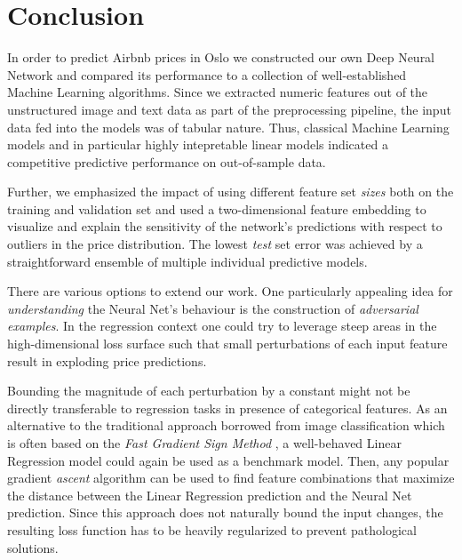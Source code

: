 \section{Conclusion}

In order to predict Airbnb prices in Oslo we constructed our own Deep Neural Network and compared its performance to a collection of well-established Machine Learning algorithms.
Since we extracted numeric features out of the unstructured image and text data as part of the preprocessing pipeline, the input data fed into the models was of tabular nature.
Thus, classical Machine Learning models and in particular highly intepretable linear models indicated a competitive predictive performance on out-of-sample data.

Further, we emphasized the impact of using different feature set \emph{sizes} both on the training and validation set and used a two-dimensional feature embedding to visualize and explain the sensitivity of the network's predictions with respect to outliers in the price distribution.
The lowest \emph{test} set error was achieved by a straightforward ensemble of multiple individual predictive models.

There are various options to extend our work.
One particularly appealing idea for \emph{understanding} the Neural Net's behaviour is the construction of \emph{adversarial examples}.
In the regression context one could try to leverage steep areas in the high-dimensional loss surface such that small perturbations of each input feature result in exploding price predictions.

Bounding the magnitude of each perturbation by a constant might not be directly transferable to regression tasks in presence of categorical features.
As an alternative to the traditional approach borrowed from image classification which is often based on the \emph{Fast Gradient Sign Method} \citep{goodfellow2015}, a well-behaved Linear Regression model could again be used as a benchmark model.
Then, any popular gradient \emph{ascent} algorithm can be used to find feature combinations that maximize the distance between the Linear Regression prediction and the Neural Net prediction.
Since this approach does not naturally bound the input changes, the resulting loss function has to be heavily regularized to prevent pathological solutions.


